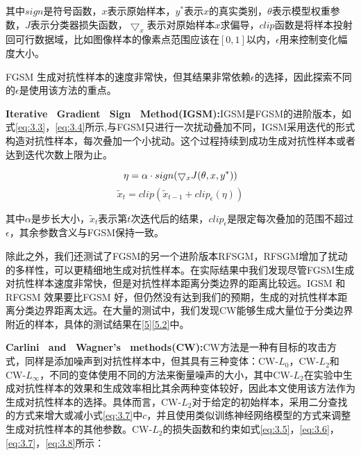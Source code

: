 \noindent 其中$sign$是符号函数，$x$表示原始样本，$y^*$表示$x$的真实类别，$\theta$表示模型权重参数，$J$表示分类器损失函数，$\bigtriangledown_x$表示对原始样本$x$求偏导，$clip$函数是将样本投射回可行数据域，比如图像样本的像素点范围应该在$[0,1]$以内，$\epsilon$用来控制变化幅度大小。

FGSM 生成对抗性样本的速度非常快，但其结果非常依赖$\epsilon$的选择，因此探索不同的$\epsilon$是使用该方法的重点。

\noindent\textbf{Iterative \ Gradient \ Sign \ Method(IGSM):}IGSM\cite{kurakin2018adversarial}是FGSM的进阶版本，如式\ref{eq:3.3}，\ref{eq:3.4}所示,与FGSM只进行一次扰动叠加不同，IGSM采用迭代的形式构造对抗性样本，每次叠加一个小扰动。这个过程持续到成功生成对抗性样本或者达到迭代次数上限为止。

\begin{equation}
	\setlength\abovedisplayshortskip{-5mm}
	\label{eq:3.3}
	\eta = \alpha \cdot sign(\bigtriangledown_xJ(\theta,x,y^*))
\end{equation}
\begin{equation}
	\label{eq:3.4}
	\tilde{x}_t = clip(\tilde{x}_{t - 1}  + clip_{\epsilon}(\eta))
\end{equation}

\noindent 其中$\alpha$是步长大小，$\tilde{x}_t$表示第$t$次迭代后的结果，$clip_{\epsilon}$是限定每次叠加的范围不超过$\epsilon$，其余参数含义与FGSM保持一致。

除此之外，我们还测试了FGSM的另一个进阶版本RFSGM\cite{tramer2017ensemble}，RFSGM增加了扰动的多样性，可以更精细地生成对抗性样本。在实际结果中我们发现尽管FGSM生成对抗性样本速度非常快，但是对抗性样本距离分类边界的距离比较远。IGSM 和RFGSM 效果要比FGSM 好，但仍然没有达到我们的预期，生成的对抗性样本距离分类边界距离太远。在大量的测试中，我们发现CW能够生成大量位于分类边界附近的样本，具体的测试结果在\ref{5}\ref{5.2}中。

\noindent\textbf{Carlini \ and \ Wagner's \ methods(CW):}CW\cite{carlini2017towards}方法是一种有目标的攻击方式，同样是添加噪声到对抗性样本中，但其具有三种变体：CW-$L_0$，CW-$L_2$和CW-$L_{\infty}$，不同的变体使用不同的方法来衡量噪声的大小，其中CW-$L_2$在实验中生成对抗性样本的效果和生成效率相比其余两种变体较好，因此本文使用该方法作为生成对抗性样本的选择。具体而言，CW-$L_2$对于给定的初始样本，采用二分查找的方式来增大或减小式\ref{eq:3.7}中$c$，并且使用类似训练神经网络模型的方式来调整生成对抗性样本的其他参数。CW-$L_2$的损失函数和约束如式\ref{eq:3.5}，\ref{eq:3.6}，\ref{eq:3.7}，\ref{eq:3.8}所示：

